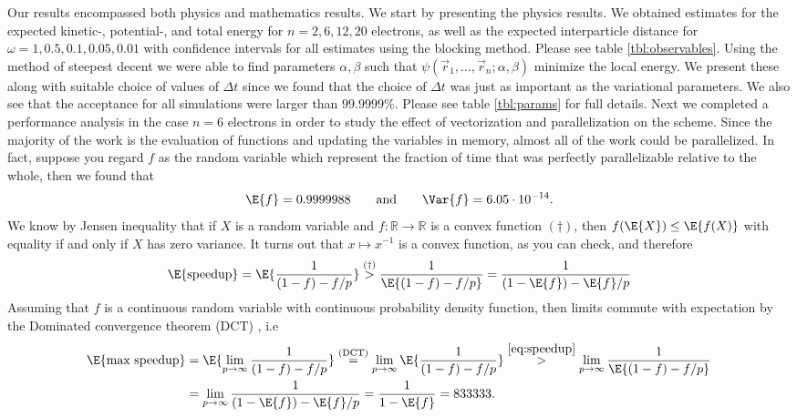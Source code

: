 \documentclass[11pt,english,a4paper]{article}
\begin{document}
Our results encompassed both physics and mathematics results. We start by presenting the physics results. We obtained estimates for the expected kinetic-, potential-, and total energy for $n=2,6,12,20$ electrons, as well as the expected interparticle distance for $\omega = 1, 0.5, 0.1, 0.05, 0.01$ with confidence intervals for all estimates using the blocking method. Please see table \ref{tbl:observables}. Using the method of steepest decent we were able to find parameters $\alpha,\beta$ such that $\psi(\vec{r}_1,\dots,\vec{r}_n;\alpha,\beta)$ minimize the local energy. We present these along with suitable choice of values of $\Delta t$ since we found that the choice of $\Delta t$ was just as important as the variational parameters. We also see that the acceptance for all simulations were larger than $99.9999\%$. Please see table \ref{tbl:params} for full details. Next we completed a performance analysis in the case $n=6$ electrons in order to study the effect of vectorization and parallelization on the scheme. Since the majority of the work is the evaluation of functions and updating the variables in memory, almost all of the work could be parallelized. In fact, suppose you regard $f$ as the random variable which represent the fraction of time that was perfectly parallelizable relative to the whole, then we found that
\[
\E{f} = 0.9999988 \qquad \text{and} \qquad \Var{f} = 6.05 \cdot 10^{-14}.
\]
We know by Jensen inequality that if $X$ is a random variable and $f : \mathbb{R} \to \mathbb{R}$ is a convex function $(\dagger)$, then $f(\E{X}) \leq \E{f(X)}$ with equality if and only if $X$ has zero variance. It turns out that $x \mapsto x^{-1}$ is a convex function, as you can check, and therefore
\begin{equation}
\E{\text{speedup}} = \E{\frac{1}{(1-f) - f/p}} \stackrel{(\dagger)}{>} \frac{1}{\E{(1-f) - f/p}} = \frac{1}{(1-\E{f}) - \E{f}/p} \label{eq:speedup}
\end{equation}
Assuming that $f$ is a continuous random variable with continuous probability density function, then limits commute with expectation by the Dominated convergence theorem (DCT) , i.e 
\begin{align*}
\E{\text{max speedup}} &= \E{ \lim_{p \to \infty} \frac{1}{(1-f) - f/p}} \stackrel{\text{(DCT)}}{=} \lim_{p \to \infty} \E{ \frac{1}{(1-f) - f/p}} \stackrel{\eqref{eq:speedup}}{>} \lim_{p \to \infty}\frac{1}{\E{(1-f) - f/p}} \\
&= \lim_{p \to \infty} \frac{1}{(1-\E{f}) - \E{f}/p} = \frac{1}{1 - \E{f}} = 833333.
\end{align*}
\end{document}
